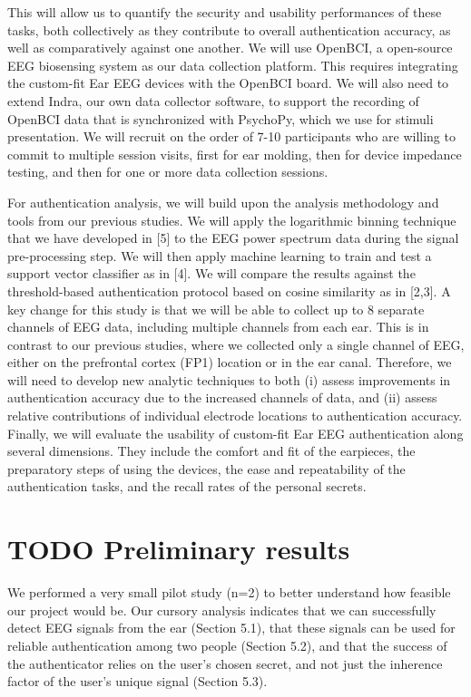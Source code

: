 \documentclass[11pt]{article}
\begin{document}
This will allow us to quantify the security and usability performances of these
tasks, both collectively as they contribute to overall authentication accuracy, as
well as comparatively against one another.
We will use OpenBCI, a open-source EEG biosensing system as our data
collection platform. This requires integrating the custom-fit Ear EEG devices with
the OpenBCI board. We will also need to extend Indra, our own data collector
software, to support the recording of OpenBCI data that is synchronized with
PsychoPy, which we use for stimuli presentation. We will recruit on the order of
7-10 participants who are willing to commit to multiple session visits, first for ear
molding, then for device impedance testing, and then for one or more data
collection sessions.

For authentication analysis, we will build upon the analysis methodology and
tools from our previous studies. We will apply the logarithmic binning technique
that we have developed in [5] to the EEG power spectrum data during the signal
pre-processing step. We will then apply machine learning to train and test a
support vector classifier as in [4]. We will compare the results against the
threshold-based authentication protocol based on cosine similarity as in [2,3].
A key change for this study is that we will be able to collect up to 8 separate
channels of EEG data, including multiple channels from each ear. This is in
contrast to our previous studies, where we collected only a single channel of
EEG, either on the prefrontal cortex (FP1) location or in the ear canal. Therefore,
we will need to develop new analytic techniques to both (i) assess improvements
in authentication accuracy due to the increased channels of data, and (ii) assess
relative contributions of individual electrode locations to authentication accuracy.
Finally, we will evaluate the usability of custom-fit Ear EEG authentication along
several dimensions. They include the comfort and fit of the earpieces, the
preparatory steps of using the devices, the ease and repeatability of the
authentication tasks, and the recall rates of the personal secrets.
\section{{\bfseries\sffamily TODO} Preliminary results}
\label{sec:orgb471f1b}

We performed a very small pilot study (n=2) to better understand how feasible 
our project would be. Our cursory analysis indicates that we can successfully
detect EEG signals from the ear (Section 5.1), that these signals can be used
for reliable authentication among two people (Section 5.2), and that the success
of the authenticator relies on the user's chosen secret, and not just the inherence
factor of the user's unique signal (Section 5.3).
\end{document}

